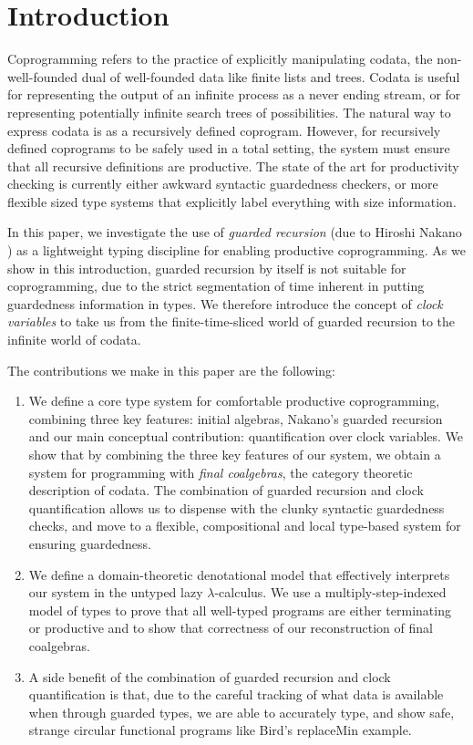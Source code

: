 \section{Introduction}
\label{sec:introduction}

Coprogramming refers to the practice of explicitly manipulating
codata, the non-well-founded dual of well-founded data like finite
lists and trees. Codata is useful for representing the output of an
infinite process as a never ending stream, or for representing
potentially infinite search trees of possibilities. The natural way to
express codata is as a recursively defined coprogram. However, for
recursively defined coprograms to be safely used in a total setting,
the system must ensure that all recursive definitions are
productive. The state of the art for productivity checking is
currently either awkward syntactic guardedness checkers, or more
flexible sized type systems that explicitly label everything with size
information.

In this paper, we investigate the use of \emph{guarded recursion} (due
to Hiroshi Nakano \cite{nakano00modality}) as a lightweight typing
discipline for enabling productive coprogramming. As we show in this
introduction, guarded recursion by itself is not suitable for
coprogramming, due to the strict segmentation of time inherent in
putting guardedness information in types. We therefore introduce the
concept of \emph{clock variables} to take us from the
finite-time-sliced world of guarded recursion to the infinite world of
codata.

The contributions we make in this paper are the following:
\begin{enumerate}
\item We define a core type system for comfortable productive
  coprogramming, combining three key features: initial algebras,
  Nakano's guarded recursion and our main conceptual contribution:
  quantification over clock variables. We show that by combining the
  three key features of our system, we obtain a system for programming
  with \emph{final coalgebras}, the category theoretic description of
  codata. The combination of guarded recursion and clock
  quantification allows us to dispense with the clunky syntactic
  guardedness checks, and move to a flexible, compositional and local
  type-based system for ensuring guardedness.
\item We define a domain-theoretic denotational model that effectively
  interprets our system in the untyped lazy $\lambda$-calculus. We use
  a multiply-step-indexed model of types to prove that all well-typed
  programs are either terminating or productive and to show that
  correctness of our reconstruction of final coalgebras.
\item A side benefit of the combination of guarded recursion and clock
  quantification is that, due to the careful tracking of what data is
  available when through guarded types, we are able to accurately
  type, and show safe, strange circular functional programs like
  Bird's replaceMin example.
\end{enumerate}

